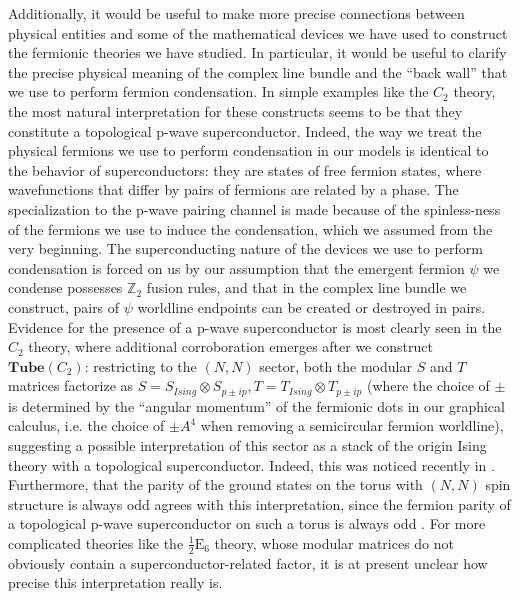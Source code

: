 \documentclass[12pt,a4paper]{article}
\newcommand{\tp}{\otimes}
\newcommand{\zt}{\mathbb{Z}_2}
\newcommand{\tube}{\textbf{Tube}}
\newcommand{\halfesix}{\frac{1}{2}\text{E}_6}
\begin{document}
Additionally, it would be useful to make more precise connections between physical entities and some of the mathematical 
devices we have used to construct the fermionic theories 
we have studied. 
In particular, it would be useful to clarify the precise physical meaning of the complex line bundle 
and the ``back wall'' that we use to perform fermion condensation. 
In simple examples like the $C_2$ theory, the most natural interpretation for these constructs 
seems to be that they constitute a topological p-wave superconductor.
Indeed, the way we treat the physical fermions we use to perform condensation 
in our models is identical to the behavior of 
superconductors: they are states of 
free fermion states, where wavefunctions that differ by pairs of 
fermions are related by a phase. 
The specialization to the p-wave pairing channel is made because of the spinless-ness
of the fermions we use to induce the condensation, which we assumed from the very 
beginning.  
The superconducting nature of the devices we use to perform condensation is forced on us
by our assumption that the emergent fermion $\psi$ we condense possesses $\zt$
fusion rules, and that in the complex line bundle we construct, pairs of
$\psi$ worldline endpoints can be created or destroyed in pairs. 
Evidence for the presence of a p-wave superconductor is most clearly seen in the $C_2$ theory, 
where additional corroboration emerges after we construct $\tube(C_2)$: 
restricting to the $(N,N)$ sector, both the modular $S$ and $T$ matrices 
factorize as $S=S_{Ising}\tp S_{p\pm ip}, T = T_{Ising} \tp T_{p\pm ip}$ (where the 
choice of $\pm$ is determined by the ``angular momentum'' of the fermionic dots 
in our graphical calculus, i.e. the choice of $\pm A^4$ when removing a semicircular fermion
worldline), suggesting a possible interpretation of this sector 
as a stack of the origin Ising theory with a topological superconductor. 
Indeed, this was noticed recently in \cite{ware2016}.
Furthermore, that the parity of the ground states on the torus with $(N,N)$ spin structure is always 
odd agrees with this interpretation, since the fermion parity of a topological 
p-wave superconductor on such a torus is always odd \cite{you2015}.
For more
complicated theories like the $\halfesix$ theory, whose modular matrices do not obviously contain a superconductor-related factor, 
it is at present unclear how precise this interpretation really is. 

\end{document}
